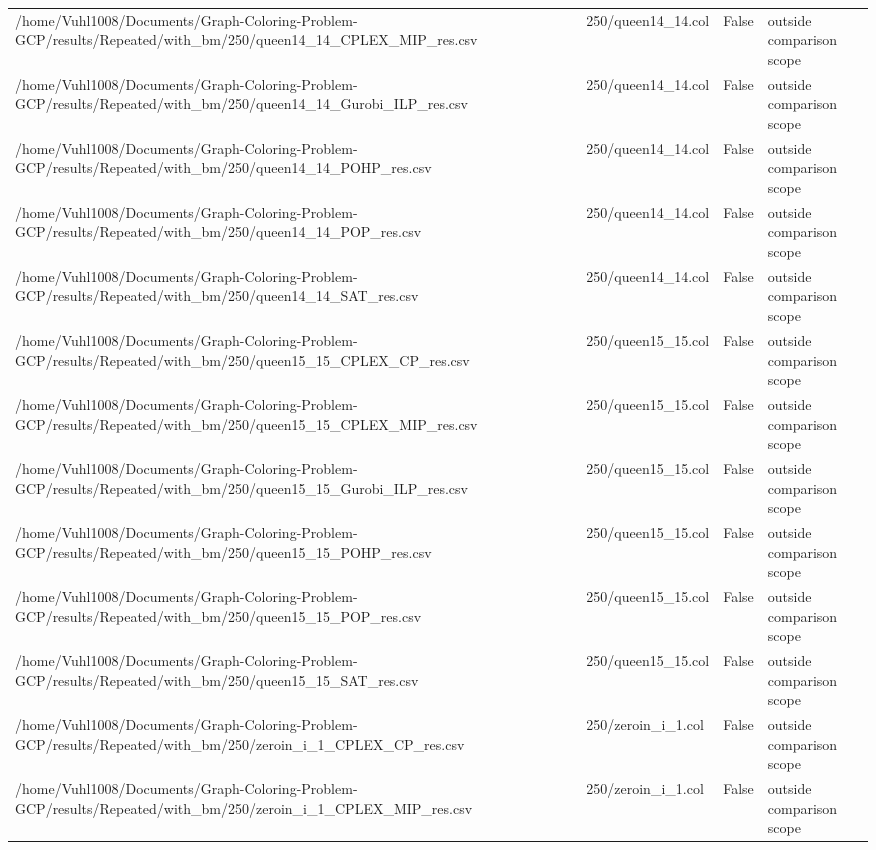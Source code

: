 \begin{table}[htbp]
\begin{tabular}{llll}
/home/Vuhl1008/Documents/Graph-Coloring-Problem-GCP/results/Repeated/with\_bm/250/queen14\_14\_CPLEX\_MIP\_res.csv & 250/queen14\_14.col & False & outside comparison scope \\
/home/Vuhl1008/Documents/Graph-Coloring-Problem-GCP/results/Repeated/with\_bm/250/queen14\_14\_Gurobi\_ILP\_res.csv & 250/queen14\_14.col & False & outside comparison scope \\
/home/Vuhl1008/Documents/Graph-Coloring-Problem-GCP/results/Repeated/with\_bm/250/queen14\_14\_POHP\_res.csv & 250/queen14\_14.col & False & outside comparison scope \\
/home/Vuhl1008/Documents/Graph-Coloring-Problem-GCP/results/Repeated/with\_bm/250/queen14\_14\_POP\_res.csv & 250/queen14\_14.col & False & outside comparison scope \\
/home/Vuhl1008/Documents/Graph-Coloring-Problem-GCP/results/Repeated/with\_bm/250/queen14\_14\_SAT\_res.csv & 250/queen14\_14.col & False & outside comparison scope \\
/home/Vuhl1008/Documents/Graph-Coloring-Problem-GCP/results/Repeated/with\_bm/250/queen15\_15\_CPLEX\_CP\_res.csv & 250/queen15\_15.col & False & outside comparison scope \\
/home/Vuhl1008/Documents/Graph-Coloring-Problem-GCP/results/Repeated/with\_bm/250/queen15\_15\_CPLEX\_MIP\_res.csv & 250/queen15\_15.col & False & outside comparison scope \\
/home/Vuhl1008/Documents/Graph-Coloring-Problem-GCP/results/Repeated/with\_bm/250/queen15\_15\_Gurobi\_ILP\_res.csv & 250/queen15\_15.col & False & outside comparison scope \\
/home/Vuhl1008/Documents/Graph-Coloring-Problem-GCP/results/Repeated/with\_bm/250/queen15\_15\_POHP\_res.csv & 250/queen15\_15.col & False & outside comparison scope \\
/home/Vuhl1008/Documents/Graph-Coloring-Problem-GCP/results/Repeated/with\_bm/250/queen15\_15\_POP\_res.csv & 250/queen15\_15.col & False & outside comparison scope \\
/home/Vuhl1008/Documents/Graph-Coloring-Problem-GCP/results/Repeated/with\_bm/250/queen15\_15\_SAT\_res.csv & 250/queen15\_15.col & False & outside comparison scope \\
/home/Vuhl1008/Documents/Graph-Coloring-Problem-GCP/results/Repeated/with\_bm/250/zeroin\_i\_1\_CPLEX\_CP\_res.csv & 250/zeroin\_i\_1.col & False & outside comparison scope \\
/home/Vuhl1008/Documents/Graph-Coloring-Problem-GCP/results/Repeated/with\_bm/250/zeroin\_i\_1\_CPLEX\_MIP\_res.csv & 250/zeroin\_i\_1.col & False & outside comparison scope \\

\end{tabular}
\end{table}
